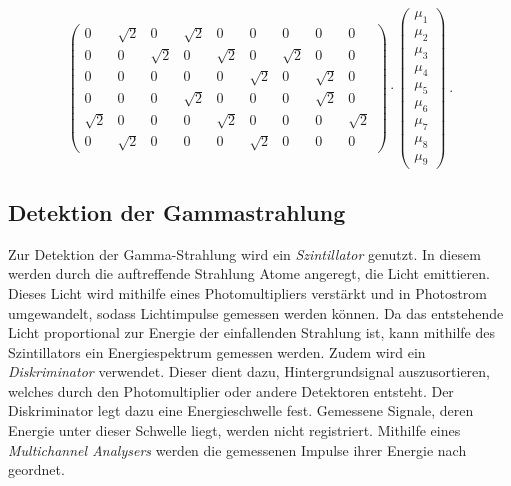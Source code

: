 \begin{equation}
\begin{pmatrix}
            0        & \sqrt{2} & 0        & \sqrt{2} & 0        & 0        & 0        & 0        & 0        \\
            0        & 0        & \sqrt{2} & 0        & \sqrt{2} & 0        & \sqrt{2} & 0        & 0        \\
            0        & 0        & 0        & 0        & 0        & \sqrt{2} & 0        & \sqrt{2} & 0        \\
            0        & 0        & 0        & \sqrt{2} & 0        & 0        & 0        & \sqrt{2} & 0        \\
            \sqrt{2} & 0        & 0        & 0        & \sqrt{2} & 0        & 0        & 0        & \sqrt{2} \\
            0        & \sqrt{2} & 0        & 0        & 0        & \sqrt{2} & 0        & 0        & 0
        \end{pmatrix}
        \cdot
        \begin{pmatrix}
            \mu_1 \\
            \mu_2 \\
            \mu_3 \\
            \mu_4 \\
            \mu_5 \\
            \mu_6 \\
            \mu_7 \\
            \mu_8 \\
            \mu_9
        \end{pmatrix}
        \ .
    \end{equation}

\subsection{Detektion der Gammastrahlung}

    Zur Detektion der Gamma-Strahlung wird ein \textit{Szintillator} genutzt.
    In diesem werden durch die auftreffende Strahlung Atome angeregt,
    die Licht emittieren.
    Dieses Licht wird mithilfe eines Photomultipliers verstärkt und in Photostrom umgewandelt,
    sodass Lichtimpulse gemessen werden können.
    Da das entstehende Licht proportional zur Energie der einfallenden Strahlung ist,
    kann mithilfe des Szintillators ein Energiespektrum gemessen werden.
    Zudem wird ein \textit{Diskriminator} verwendet.
    Dieser dient dazu,
    Hintergrundsignal auszusortieren,
    welches durch den Photomultiplier oder andere Detektoren entsteht.
    Der Diskriminator legt dazu eine Energieschwelle fest.
    Gemessene Signale,
    deren Energie unter dieser Schwelle liegt,
    werden nicht registriert.
    Mithilfe eines \textit{Multichannel Analysers} werden die gemessenen Impulse ihrer Energie nach geordnet.

